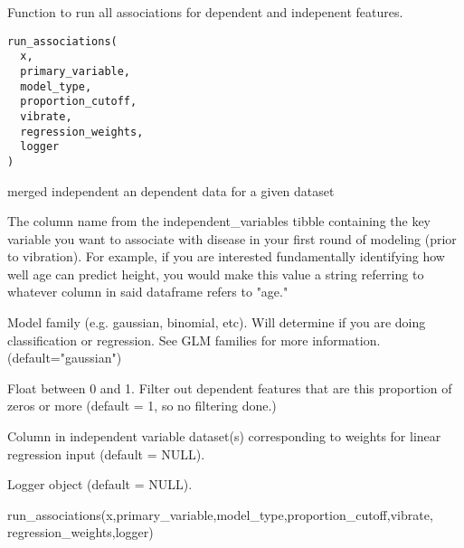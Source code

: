 \documentclass[a4paper]{book}
\begin{document}
%
\begin{Description}\relax
Function to run all associations for dependent and indepenent features.
\end{Description}
%
\begin{Usage}
\begin{verbatim}
run_associations(
  x,
  primary_variable,
  model_type,
  proportion_cutoff,
  vibrate,
  regression_weights,
  logger
)
\end{verbatim}
\end{Usage}
%
\begin{Arguments}
\begin{ldescription}
\item[\code{x}] merged independent an dependent data for a given dataset

\item[\code{primary\_variable}] The column name from the independent\_variables tibble containing the key variable you want to associate with disease in your first round of modeling (prior to vibration). For example, if you are interested fundamentally identifying how well age can predict height, you would make this value a string referring to whatever column in said dataframe refers to "age."

\item[\code{model\_type}] Model family (e.g. gaussian, binomial, etc). Will determine if you are doing classification or regression. See GLM families for more information. (default="gaussian")

\item[\code{proportion\_cutoff}] Float between 0 and 1. Filter out dependent features that are this proportion of zeros or more (default = 1, so no filtering done.)

\item[\code{regression\_weights}] Column in independent variable dataset(s) corresponding to weights  for linear regression input (default = NULL).

\item[\code{logger}] Logger object (default = NULL).
\end{ldescription}
\end{Arguments}
%
\begin{Examples}
\begin{ExampleCode}
run_associations(x,primary_variable,model_type,proportion_cutoff,vibrate, regression_weights,logger)
\end{ExampleCode}
\end{Examples}
\end{document}

